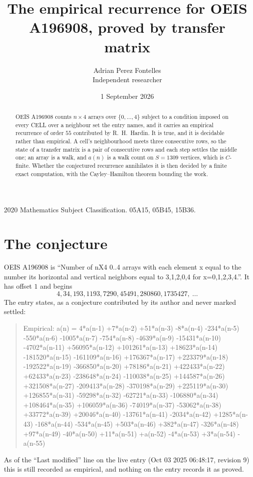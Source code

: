 \documentclass[11pt,a4paper]{article}
\title{The empirical recurrence for OEIS A196908, proved by transfer matrix}
\author{Adrian Perez Fontelles\\ \small Independent researcher}
\date{1 September 2026}
\theoremstyle{plain}
\theoremstyle{definition}
\begin{document}
\maketitle

\begin{abstract}
OEIS A196908 counts $n\times4$ arrays over $\{0,\dots,4\}$ subject to a condition imposed on
every CELL over a neighbour set the entry names, and it carries an empirical recurrence of
order $55$ contributed by R.~H.~Hardin. It is true, and it is decidable rather than
empirical. A cell's neighbourhood meets three consecutive rows, so the state of a transfer
matrix is a pair of consecutive rows and each step settles the middle one; an array is a
walk, and $a(n)$ is a walk count on $S=1309$ vertices, which is $C$-finite. Whether the
conjectured recurrence annihilates it is then decided by a finite exact computation, with the
Cayley--Hamilton theorem bounding the work.
\end{abstract}

\noindent\small 2020 Mathematics Subject Classification. 05A15, 05B45, 15B36.\normalsize

\section{The conjecture}

OEIS A196908 is ``Number of nX4 0..4 arrays with each element x equal to the number its horizontal and vertical neighbors equal to 3,1,2,0,4 for x=0,1,2,3,4.''. It has offset $1$ and begins
\[
4, 34, 193, 1193, 7290, 45491, 280860, 1735427,\ \dots
\]
The entry states, as a conjecture contributed by its author and never marked settled:
\begin{quote}
Empirical: a(n) = 4*a(n-1) +7*a(n-2) +51*a(n-3) -8*a(n-4) -234*a(n-5) -550*a(n-6) -1005*a(n-7) -754*a(n-8) -4639*a(n-9) -15431*a(n-10) -4702*a(n-11) +56095*a(n-12) +101261*a(n-13) +18623*a(n-14) -181520*a(n-15) -161109*a(n-16) +176367*a(n-17) +223379*a(n-18) -192522*a(n-19) -366850*a(n-20) +78186*a(n-21) +422433*a(n-22) +62433*a(n-23) -238648*a(n-24) -110038*a(n-25) +144587*a(n-26) +321508*a(n-27) -209413*a(n-28) -370198*a(n-29) +225119*a(n-30) +126855*a(n-31) -59298*a(n-32) -62721*a(n-33) -106880*a(n-34) +108464*a(n-35) +106059*a(n-36) -74019*a(n-37) -53062*a(n-38) +33772*a(n-39) +20046*a(n-40) -13761*a(n-41) -2034*a(n-42) +1285*a(n-43) -168*a(n-44) -534*a(n-45) +503*a(n-46) +382*a(n-47) -326*a(n-48) +97*a(n-49) -40*a(n-50) +11*a(n-51) +a(n-52) -4*a(n-53) +3*a(n-54) -a(n-55)
\end{quote}
As of the ``Last modified'' line on the live entry (Oct 03 2025 06:48:17, revision 9) this is still
recorded as empirical, and nothing on the entry records it as proved.
\end{document}
